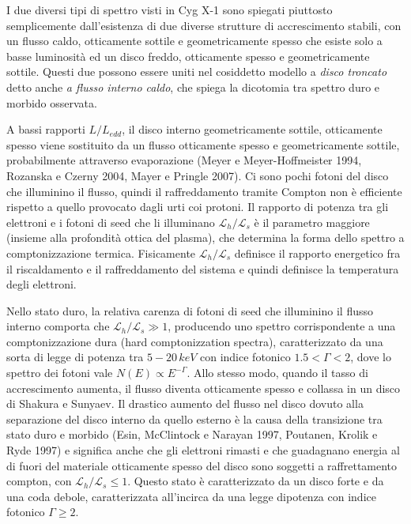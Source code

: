 \documentclass[a4paperbi]{article}
\begin{document}
I due diversi tipi di spettro visti in Cyg X-1 sono spiegati piuttosto semplicemente dall'esistenza di due diverse strutture di accrescimento stabili, con un flusso caldo, otticamente sottile e geometricamente spesso che esiste solo a basse luminosità ed un disco freddo, otticamente spesso e geometricamente sottile. Questi due possono essere uniti nel cosiddetto modello a \textit{disco troncato} detto anche \textit{a flusso interno caldo}, che spiega la dicotomia tra spettro duro e morbido osservata.

	A bassi rapporti $L/L_{edd}$, il disco interno geometricamente sottile, otticamente spesso viene sostituito da un flusso otticamente spesso e geometricamente sottile, probabilmente attraverso evaporazione (Meyer e Meyer-Hoffmeister 1994, Rozanska e Czerny 2004, Mayer e Pringle 2007). Ci sono pochi fotoni del disco che illuminino il flusso, quindi il raffreddamento tramite Compton non è efficiente rispetto a quello provocato dagli urti coi protoni. Il rapporto di potenza tra gli elettroni e i fotoni di seed che li illuminano $\mathcal{L}_h/\mathcal{L}_s$ è il parametro maggiore (insieme alla profondità ottica del plasma), che determina la forma dello spettro a comptonizzazione termica. Fisicamente $\mathcal{L}_h/\mathcal{L}_s$ definisce il rapporto energetico fra il riscaldamento e il raffreddamento del sistema e quindi definisce la temperatura degli elettroni.
	
	Nello stato duro, la relativa carenza di fotoni di seed che illuminino il flusso interno comporta che $\mathcal{L}_h/\mathcal{L}_s\gg1$, producendo uno spettro corrispondente a una comptonizzazione dura (hard comptonizzation spectra), caratterizzato da una sorta di legge di potenza tra $5-20\,keV$ con indice fotonico $1.5<\Gamma<2$, dove lo spettro dei fotoni vale $N(E)\propto E^{-\Gamma}$. Allo stesso modo, quando il tasso di accrescimento aumenta, il flusso diventa otticamente spesso e collassa in un disco di Shakura e Sunyaev. Il drastico aumento del flusso nel disco dovuto alla separazione del disco interno da quello esterno è la causa della transizione tra stato duro e morbido (Esin, McClintock e Narayan 1997, Poutanen, Krolik e Ryde 1997) e significa anche che gli elettroni rimasti e che guadagnano energia al di fuori del materiale otticamente spesso del disco sono soggetti a raffrettamento compton, con $\mathcal{L}_h/\mathcal{L}_s\leq1$. Questo stato è caratterizzato da un disco forte e da una coda debole, caratterizzata all'incirca da una legge dipotenza con indice fotonico $\Gamma\geq2$.
	
\end{document}
